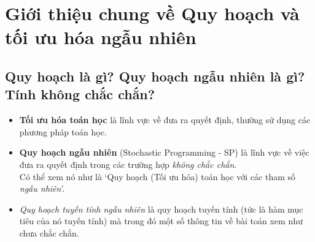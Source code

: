 \documentclass[a4paper]{article}
\begin{document}

\newpage
\tableofcontents
\newpage


\section{Giới thiệu chung về Quy hoạch và tối ưu hóa ngẫu nhiên}
    \subsection{Quy hoạch là gì? Quy hoạch ngẫu nhiên là gì? Tính không chắc chắn?}
        \begin{itemize}
            \item \textbf{Tối ưu hóa toán học} là lĩnh vực về đưa ra quyết định, thường sử dụng các phương pháp toán học.
            \item \textbf{Quy hoạch ngẫu nhiên} (Stochastic Programming - SP) là lĩnh vực về việc đưa ra quyết định trong các trường hợp \textit{không chắc chắn}.
            \\Có thể xem nó như là `Quy hoạch (Tối ưu hóa) toán học với các tham số \textit{ngẫu nhiên}'.
            \item \textit{Quy hoạch tuyến tính ngẫu nhiên} là quy hoạch tuyến tính (tức là hàm mục tiêu của nó tuyến tính) mà trong đó một số thông tin về bài toán xem như chưa chắc chắn.
        \end{itemize}
\end{document}
